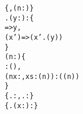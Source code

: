 \begin{alltt}
\scriptsize\ttfamily{}  \{ , (n: ) \}
 .(y: ):  \{
     => y,
    (x') => (x'.(y))
\}
 (n: ) \{
    : (),
    (n x: , xs: (n)): ((n))
\}
  \{ .: , .:  \}
  \{ .(x: ):  \}\end{alltt}
